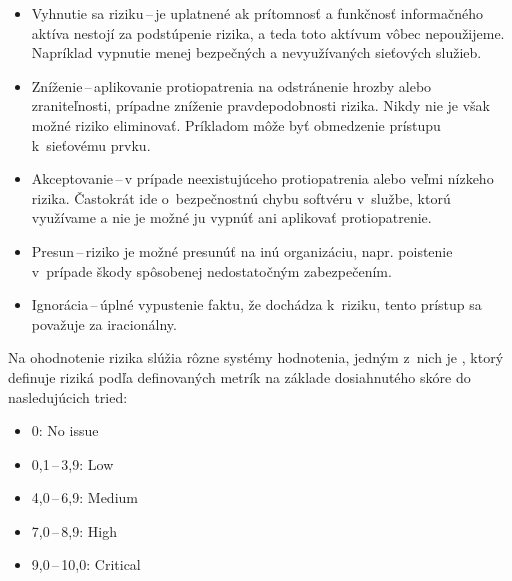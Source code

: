 \begin{itemize}
	\item Vyhnutie sa riziku\,--\,je uplatnené ak prítomnosť a funkčnosť informačného aktíva nestojí za podstúpenie rizika, a teda toto aktívum vôbec nepoužijeme. Napríklad vypnutie menej bezpečných a nevyužívaných sieťových služieb.  
	
	\item Zníženie\,--\,aplikovanie protiopatrenia na odstránenie hrozby alebo zraniteľnosti, prípadne zníženie pravdepodobnosti rizika. Nikdy nie je však možné riziko eliminovať. Príkladom môže byť obmedzenie prístupu k~sieťovému prvku.
	
	\item Akceptovanie\,--\,v prípade neexistujúceho protiopatrenia alebo veľmi nízkeho rizika. Častokrát ide o~bezpečnostnú chybu softvéru v~službe, ktorú využívame a nie je možné ju vypnúť ani aplikovať protiopatrenie.
	
	\item Presun\,--\,riziko je možné presunúť na inú organizáciu, napr. poistenie v~prípade škody spôsobenej nedostatočným zabezpečením.
	
	\item Ignorácia\,--\,úplné vypustenie faktu, že dochádza k~riziku, tento prístup sa považuje za iracionálny.
\end{itemize}
\vspace{2em}
\noindent
Na ohodnotenie rizika slúžia rôzne systémy hodnotenia, jedným z~nich je  , ktorý definuje riziká podľa definovaných metrík na základe dosiahnutého skóre do nasledujúcich tried:

\begin{itemize}
	\item 0: No issue
	\item 0,1\,--\,3,9: Low
	\item 4,0\,--\,6,9: Medium
	\item 7,0\,--\,8,9: High
	\item 9,0\,--\,10,0: Critical
\end{itemize} 